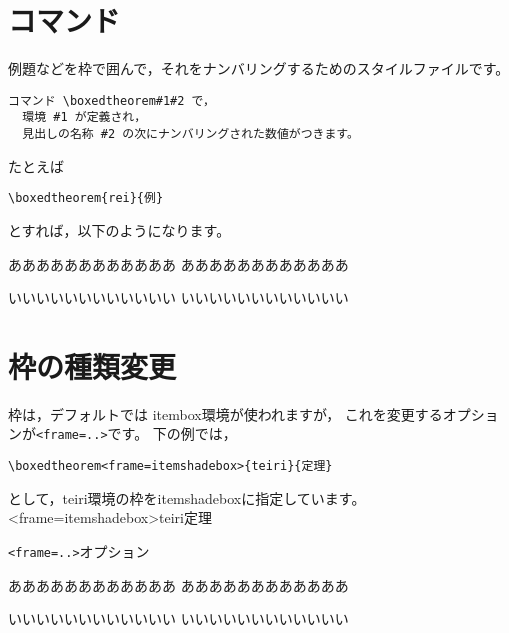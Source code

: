 \documentclass[a4j]{jarticle}
\begin{document}
\section{コマンド}
例題などを枠で囲んで，それをナンバリングするためのスタイルファイルです。

\begin{jquote}
\begin{verbatim}
コマンド \boxedtheorem#1#2 で，
  環境 #1 が定義され，
  見出しの名称 #2 の次にナンバリングされた数値がつきます。
\end{verbatim}
\end{jquote}

たとえば

\begin{jquote}
\begin{verbatim}
\boxedtheorem{rei}{例}
\end{verbatim}
\end{jquote}
とすれば，以下のようになります。

\begin{showEx}{}
\begin{rei}
ああああああああああああ
ああああああああああああ
\end{rei}

\begin{rei}
いいいいいいいいいいいい
いいいいいいいいいいいい
\end{rei}
\end{showEx}

\section{枠の種類変更}
枠は，デフォルトでは \textsf{itembox}環境が使われますが，
これを変更するオプションが\texttt{<frame=..>}です。
下の例では，
\begin{jquote}
\begin{verbatim}
\boxedtheorem<frame=itemshadebox>{teiri}{定理}
\end{verbatim}
\end{jquote}
として，\textsf{teiri}環境の枠を\textsf{itemshadebox}に指定しています。
\boxedtheorem<frame=itemshadebox>{teiri}{定理}

\begin{showEx}{\texttt{<frame=..>}オプション}
\begin{teiri}
ああああああああああああ
ああああああああああああ
\end{teiri}

\begin{teiri}
いいいいいいいいいいいい
いいいいいいいいいいいい
\end{teiri}
\end{showEx}
\end{document}
